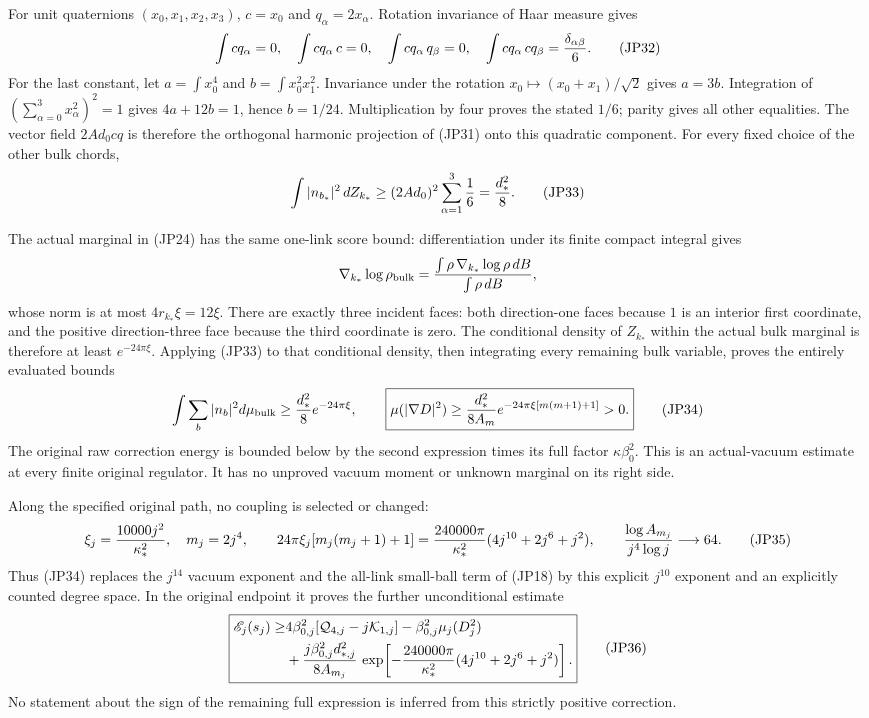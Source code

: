 \documentclass[11pt]{article}
\begin{document}
For unit quaternions \((x_0,x_1,x_2,x_3)\), \(c=x_0\) and
\(q_\alpha=2x_\alpha\). Rotation invariance of Haar measure gives
\[
 \int cq_\alpha=0,\quad
 \int cq_\alpha\,c=0,\quad
 \int cq_\alpha\,q_\beta=0,\quad
 \int cq_\alpha\,cq_\beta={\delta_{\alpha\beta}\over6}.
 \tag{JP32}
\]
For the last constant, let \(a=\int x_0^4\) and
\(b=\int x_0^2x_1^2\). Invariance under the rotation
\(x_0\mapsto(x_0+x_1)/\sqrt2\) gives \(a=3b\).
Integration of \((\sum_{\alpha=0}^3x_\alpha^2)^2=1\) gives
\(4a+12b=1\), hence \(b=1/24\). Multiplication by four proves
the stated \(1/6\); parity gives all other equalities.
The vector field \(2Ad_0cq\) is therefore the orthogonal harmonic
projection of (JP31) onto this quadratic component. For every fixed
choice of the other bulk chords,
\[
 \int |n_{b_*}|^2\,dZ_{k_*}
 \ge (2Ad_0)^2\sum_{\alpha=1}^3{1\over6}
 ={d_*^2\over8}.
 \tag{JP33}
\]

The actual marginal in (JP24) has the same one-link score bound:
differentiation under its finite compact integral gives
\[
 \nabla_{k_*}\log\rho_{\rm bulk}
 ={\int\rho\,\nabla_{k_*}\log\rho\,dB\over
          \int\rho\,dB},
\]
whose norm is at most \(4r_{k_*}\xi=12\xi\).
There are exactly three incident faces: both direction-one faces
because \(1\) is an interior first coordinate, and the positive
direction-three face because the third coordinate is zero.
The conditional density of \(Z_{k_*}\) within the actual bulk marginal
is therefore at least \(e^{-24\pi\xi}\). Applying (JP33) to that
conditional density, then integrating every remaining bulk variable,
proves the entirely evaluated bounds
\[
 \int\sum_b|n_b|^2d\mu_{\rm bulk}
       \ge {d_*^2\over8}e^{-24\pi\xi},\qquad
 \boxed{\displaystyle
 \mu(|\nabla D|^2)\ge
 {d_*^2\over8A_m}
       e^{-24\pi\xi[m(m+1)+1]}>0.}
 \tag{JP34}
\]
The original raw correction energy is bounded below by the second
expression times its full factor \(\kappa\beta_0^2\).
This is an actual-vacuum estimate at every finite original regulator.
It has no unproved vacuum moment or unknown marginal on its right side.

Along the specified original path, no coupling is selected or changed:
\[
 \xi_j={10000j^2\over\kappa_*^2},\quad m_j=2j^4,\qquad
 24\pi\xi_j[m_j(m_j+1)+1]
 ={240000\pi\over\kappa_*^2}
             (4j^{10}+2j^6+j^2),\qquad
 {\log A_{m_j}\over j^4\log j}\longrightarrow64 .
 \tag{JP35}
\]
Thus (JP34) replaces the \(j^{14}\) vacuum exponent and the
all-link small-ball term of (JP18) by this explicit \(j^{10}\)
exponent and an explicitly counted degree space. In the original
endpoint it proves the further unconditional estimate
\[
 \boxed{\begin{aligned}
 \mathscr E_j(s_j)\ge&
 4\beta_{0,j}^2[\mathcal Q_{4,j}-j\mathcal K_{1,j}]
       -\beta_{0,j}^2\mu_j(D_j^2)\\
 &+{j\beta_{0,j}^2d_{*,j}^2\over8A_{m_j}}\,
    \exp\!\left[-{240000\pi\over\kappa_*^2}
                       (4j^{10}+2j^6+j^2)\right].
 \end{aligned}}\tag{JP36}
\]
No statement about the sign of the remaining full expression is
inferred from this strictly positive correction.
\end{document}
